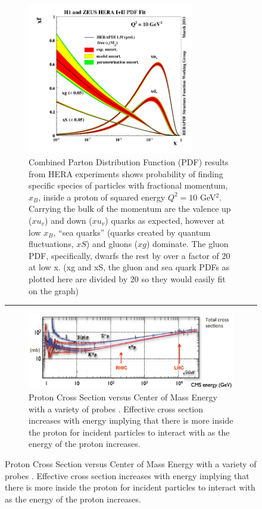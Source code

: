 \begin{figure}
\centering
\begin{subfigure}[p]{0.8\textwidth}
  \centering
    \includegraphics[width=0.8\textwidth]{prevplots/herapdf15f_alpha.png}
  \caption[H1 and ZEUS Parton Distribution Functions]{Combined Parton Distribution Function (PDF) results from HERA experiments \citep{Abramowicz2015} shows probability of finding specific species of particles with fractional momentum, $x_{B}$, inside a proton of squared energy $Q^2 = 10$ GeV$^2$. Carrying the bulk of the momentum are the valence up ($xu_v$) and down ($xu_v$) quarks as expected, however at low $x_{B}$, ``sea quarks'' (quarks created by quantum fluctuations, $xS$) and gluons ($xg$) dominate. The gluon PDF, specifically, dwarfs the rest by over a factor of 20 at low x. (xg and xS, the gluon and sea quark PDFs as plotted here are divided by 20 so they would easily fit on the graph)}
  \label{fig:HERAPDF}
\end{subfigure}
    \rule{35em}{0.5pt}
\begin{subfigure}[p]{0.8\textwidth}
  \centering
    \includegraphics[width=1\textwidth]{prevplots/protoncrosssection.JPG}
  \caption[Proton Cross Section vs Center of Mass Energy.]{Proton Cross Section versus Center of Mass Energy with a variety of probes \citep{PDGcrosssection} \citep{Itakura2012}. Effective cross section increases with energy implying that there is more inside the proton for incident particles to interact with as the energy of the proton increases.}
  \label{fig:PDGxsection}
\end{subfigure}
\end{figure}

